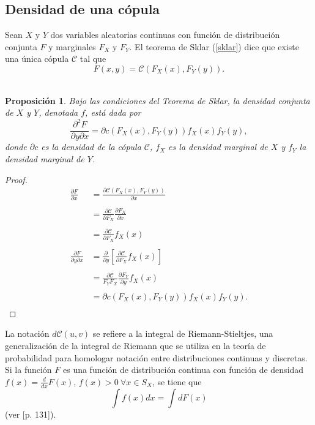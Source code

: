 \documentclass[11pt,a4paper]{article}
\newtheorem{proposition}{Proposición}[subsection]
\begin{document}
\appendixtitleon
\appendixtitletocon
\begin{appendices}
\section{Densidad de una cópula} \label{densidad_copula}

Sean $X$ y $Y$ dos variables aleatorias continuas con función de distribución conjunta $F$ y marginales $F_X$ y $F_Y$. El teorema de Sklar (\ref{sklar}) dice que existe una única cópula $\mathcal{C}$ tal que $$F(x, y) = \mathcal{C}(F_X(x), F_Y(y)).$$\\

\begin{proposition}
Bajo las condiciones del Teorema de Sklar, la densidad conjunta de $X$ y $Y$, denotada $f$, está dada por $$\frac{\partial^2 F}{\partial y \partial x} = \partial c(F_X(x), F_Y(y))f_X(x)f_Y(y),$$ donde $\partial c$ es la densidad de la cópula $\mathcal{C}$, $f_X$ es la densidad marginal de $X$ y $f_Y$ la densidad marginal de $Y$.
\end{proposition} 

\begin{proof}
\begin{align*}
\frac{\partial F}{\partial x} &= \frac{\partial \mathcal{C}(F_X(x), F_Y(y))}{\partial x}\\\\
&= \frac{\partial \mathcal{C}}{\partial F_X} \frac{\partial F_X}{\partial x}\\\\
&= \frac{\partial \mathcal{C}}{\partial F_X}f_X(x)\\\\
\frac{\partial F}{\partial y \partial x} &= \frac{\partial}{\partial y} \left[\frac{\partial \mathcal{C}}{\partial F_X}f_X(x)\right]\\\\
&= \frac{\partial \mathcal{C}}{F_Y F_X}\frac{\partial F_Y}{\partial y}f_X(x)\\\\
&= \partial c (F_X(x), F_Y(y)) f_X(x) f_Y(y).\\
\end{align*}
\end{proof}

La notación $d\mathcal{C}(u, v)$ se refiere a la integral de Riemann-Stieltjes, una generalización de la integral de Riemann que se utiliza en la teoría de probabilidad para homologar notación entre distribuciones continuas y discretas. Si la función $F$ es una función de distribución continua con función de densidad $f(x) = \frac{d}{dx}F(x)$, $f(x) > 0 \ \forall x \in S_X$, se tiene que $$\int f(x) dx = \int dF(x)$$ (ver \citet{rudin}[p. 131]).\\


\end{appendices}
\end{document}
